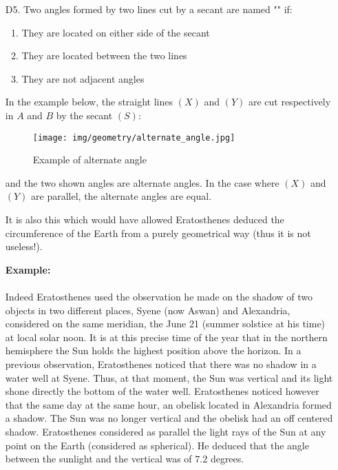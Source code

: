 \begin{enumerate}
		\item[D5.] Two angles formed by two lines cut by a secant are named "" if:
		\begin{enumerate}
			\item They are located on either side of the secant
	
			\item They are located between the two lines
			
			\item They are not adjacent angles
		\end{enumerate}
		In the example below, the straight lines $(X)$ and $(Y)$ are cut respectively in $A$ and $B$ by the secant $(S)$:
		\begin{figure}[H]
			\centering
			\texttt{[image: img/geometry/alternate\_angle.jpg]}
			\caption{Example of alternate angle}
		\end{figure}
		and the two shown angles are alternate angles. In the case where $(X)$ and $(Y)$ are parallel, the alternate angles are equal. 

		It is also this which would have allowed Eratosthenes deduced the circumference of the Earth from a purely geometrical way (thus it is not useless!).
		
		\begin{tcolorbox}[colframe=black,colback=white,sharp corners]
		\textbf{{\Large {}}Example:}\\\\
		Indeed Eratosthenes used the observation he made on the shadow of two objects in two different places, Syene (now Aswan) and Alexandria, considered on the same meridian, the June 21 (summer solstice at his time) at local solar noon. It is at this precise time of the year that in the northern hemisphere the Sun holds the highest position above the horizon. In a previous observation, Eratosthenes noticed that there was no shadow in a water well at Syene. Thus, at that moment, the Sun was vertical and its light shone directly the bottom of the water well. Eratosthenes noticed however that the same day at the same hour, an obelisk located in Alexandria formed a shadow. The Sun was no longer vertical and the obelisk had an off centered shadow. Eratosthenes considered as parallel the light rays of the Sun at any point on the Earth (considered as spherical). He deduced that the angle between the sunlight and the vertical was of $7.2$ degrees.\\
		

\end{tcolorbox}
\end{enumerate}
